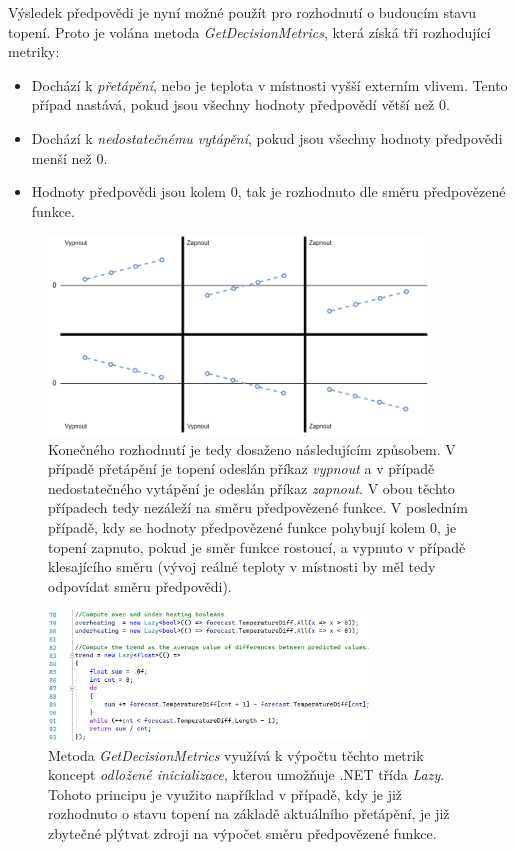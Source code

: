 Výsledek předpovědi je nyní možné použít pro rozhodnutí o budoucím stavu topení. Proto je volána metoda {\it GetDecisionMetrics}, která získá tři rozhodující metriky:
\begin{itemize}
    \item Dochází k {\it přetápění}, nebo je teplota v místnosti vyšší externím vlivem. Tento případ nastává, pokud jsou všechny hodnoty předpovědí větší než 0.
    \item Dochází k {\it nedostatečnému vytápění}, pokud jsou všechny hodnoty předpovědi menší než 0.
    \item Hodnoty předpovědi jsou kolem 0, tak je rozhodnuto dle směru předpovězené funkce.
\end{itemize}

\begin{figure}[H]
\centering
\includegraphics[width=0.9\textwidth]{obrazky-figures/mlalgorithm.png}
\caption{Konečného rozhodnutí je tedy dosaženo následujícím způsobem. V případě přetápění je topení odeslán příkaz {\it vypnout} a v případě nedostatečného vytápění je odeslán příkaz {\it zapnout}. V obou těchto případech tedy nezáleží na směru předpovězené funkce. V posledním případě, kdy se hodnoty předpovězené funkce pohybují kolem 0, je topení zapnuto, pokud je směr funkce rostoucí, a vypnuto v případě klesajícího směru (vývoj reálné teploty v místnosti by měl tedy odpovídat směru předpovědi).}
\end{figure}

\begin{figure}[H]
\includegraphics[width=0.76\textwidth]{obrazky-figures/code-get-ml-metrics.png}
\caption{Metoda {\it GetDecisionMetrics} využívá k výpočtu těchto metrik koncept {\it odložené inicializace}, kterou umožňuje .NET třída {\it Lazy}. Tohoto principu je využito například v případě, kdy je již rozhodnuto o stavu topení na základě aktuálního přetápění, je již zbytečné plýtvat zdroji na výpočet směru předpovězené funkce.}
\end{figure}


